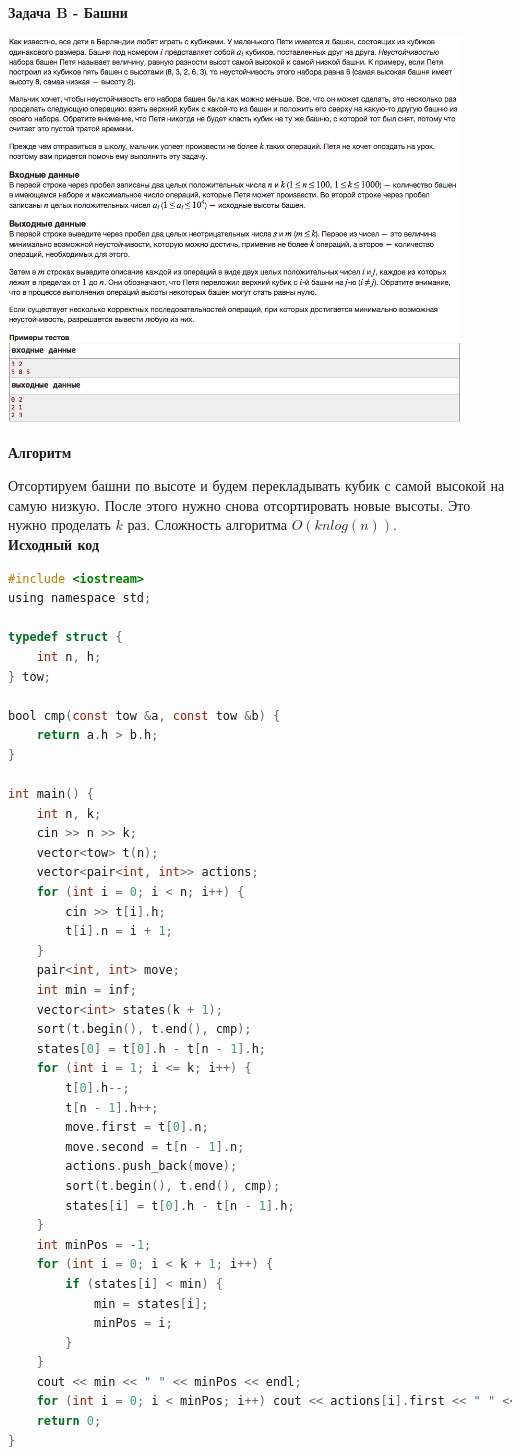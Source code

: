 \documentclass[a4paper,12pt]{article}
\begin{document}
\newpage
\textbf{{\large Задача B - Башни}}

\begin{center}
\includegraphics[width=0.9\textwidth]{C_274/C_274_B.png}\\ [1cm]
\end{center}

\textbf{{\large Алгоритм}}

Отсортируем башни по высоте и будем перекладывать кубик с самой высокой на самую низкую. После этого нужно снова отсортировать новые высоты. Это нужно проделать $k$ раз. Сложность алгоритма $O(knlog(n))$.\\

\textbf{{\large Исходный код}} \\
\begin{lstlisting}[language=C]
#include <iostream>
using namespace std;

typedef struct {
    int n, h;
} tow;

bool cmp(const tow &a, const tow &b) {
    return a.h > b.h;
}

int main() {
    int n, k;
    cin >> n >> k;
    vector<tow> t(n);
    vector<pair<int, int>> actions;
    for (int i = 0; i < n; i++) {
        cin >> t[i].h;
        t[i].n = i + 1;
    }
    pair<int, int> move;
    int min = inf;
    vector<int> states(k + 1);
    sort(t.begin(), t.end(), cmp);
    states[0] = t[0].h - t[n - 1].h;
    for (int i = 1; i <= k; i++) {
        t[0].h--;
        t[n - 1].h++;
        move.first = t[0].n;
        move.second = t[n - 1].n;
        actions.push_back(move);
        sort(t.begin(), t.end(), cmp);
        states[i] = t[0].h - t[n - 1].h;
    }
    int minPos = -1;
    for (int i = 0; i < k + 1; i++) {
        if (states[i] < min) {
            min = states[i];
            minPos = i;
        }
    }
    cout << min << " " << minPos << endl;
    for (int i = 0; i < minPos; i++) cout << actions[i].first << " " << actions[i].second << endl;
    return 0;
}
\end{lstlisting}
\end{document}
